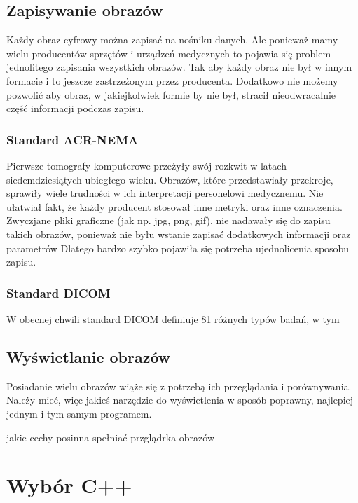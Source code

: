 \subsection{Zapisywanie obrazów}

Każdy obraz cyfrowy można zapisać na nośniku danych.
Ale ponieważ mamy wielu producentów sprzętów i urządzeń medycznych to pojawia się problem jednolitego zapisania wszystkich obrazów.
Tak aby każdy obraz nie był w innym formacie i to jeszcze zastrzeżonym przez producenta.
Dodatkowo nie możemy pozwolić aby obraz, w jakiejkolwiek formie by nie był, stracił nieodwracalnie część informacji podczas zapisu.

\subsubsection{Standard ACR-NEMA}

Pierwsze tomografy komputerowe przeżyły swój rozkwit w latach siedemdziesiątych ubiegłego wieku.
Obrazów, które przedstawiały przekroje, sprawiły wiele trudności w ich interpretacji personelowi medycznemu.
Nie ułatwiał fakt, że każdy producent stosował inne metryki oraz inne oznaczenia.
Zwyczjane pliki graficzne (jak np. jpg, png, gif), nie nadawały się do zapisu takich obrazów, ponieważ nie byłu wstanie zapisać dodatkowych informacji oraz parametrów 
Dlatego bardzo szybko pojawiła się potrzeba ujednolicenia sposobu zapisu.

\subsubsection{Standard DICOM}

W obecnej chwili standard DICOM definiuje 81 różnych typów badań, w tym

\subsection{Wyświetlanie obrazów}


Posiadanie wielu obrazów wiąże się z potrzebą ich przeglądania i porównywania.
Należy mieć, więc jakieś narzędzie do wyświetlenia w sposób poprawny, najlepiej jednym i tym samym programem.

jakie cechy posinna spełniać przglądrka obrazów


\section{Wybór C++}

